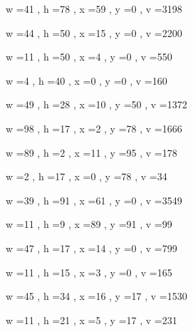 \documentclass[11pt]{article}
\begin{document}
w =41 , h =78 , x =59 , y =0 , v =3198
\par
w =44 , h =50 , x =15 , y =0 , v =2200
\par
w =11 , h =50 , x =4 , y =0 , v =550
\par
w =4 , h =40 , x =0 , y =0 , v =160
\par
w =49 , h =28 , x =10 , y =50 , v =1372
\par
w =98 , h =17 , x =2 , y =78 , v =1666
\par
w =89 , h =2 , x =11 , y =95 , v =178
\par
w =2 , h =17 , x =0 , y =78 , v =34
\par
\newpage




w =39 , h =91 , x =61 , y =0 , v =3549
\par
w =11 , h =9 , x =89 , y =91 , v =99
\par
w =47 , h =17 , x =14 , y =0 , v =799
\par
w =11 , h =15 , x =3 , y =0 , v =165
\par
w =45 , h =34 , x =16 , y =17 , v =1530
\par
w =11 , h =21 , x =5 , y =17 , v =231
\par
\newpage
\end{document}
